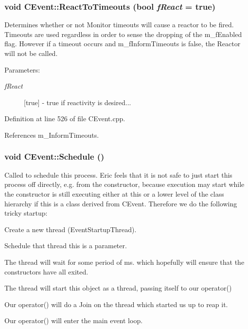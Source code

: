 \subsubsection{\setlength{\rightskip}{0pt plus 5cm}void CEvent::React\-To\-Timeouts (bool {\em f\-React} = true)}\label{classCEvent_a15}


Determines whether or not Monitor timeouts will cause a reactor to be fired. Timeouts are used regardless in order to sense the dropping of the m\_\-f\-Enabled flag. However if a timeout occurs and  m\_\-f\-Inform\-Timeouts is false, the Reactor will not be called.\begin{Desc}
\item[Parameters: ]\par
\begin{description}
\item[{\em 
f\-React}][true] - true if reactivity is desired... \end{description}
\end{Desc}


Definition at line 526 of file CEvent.cpp.

References m\_\-Inform\-Timeouts.
\subsubsection{\setlength{\rightskip}{0pt plus 5cm}void CEvent::Schedule ()\hspace{0.3cm}{\tt  [protected]}}\label{classCEvent_b3}


Called to schedule this process. Eric feels that it is not safe to just start this process off directly, e.g. from the constructor, because execution may start while the constructor is still executing either at this or a  lower level of the class hierarchy if this is a class derived from CEvent. Therefore we do the following tricky startup:

\begin{CompactItemize}
\item 
Create a new thread (Event\-Startup\-Thread).\item 
Schedule that thread this is a parameter.\item 
The thread will wait for some period of ms. which hopefully will ensure that the constructors have all exited.\item 
The thread will start this object as a thread, passing itself to our operator()\item 
Our operator() will do a Join on the thread which started us up to reap it.\item 
Our operator() will enter the main event loop. \end{CompactItemize}


